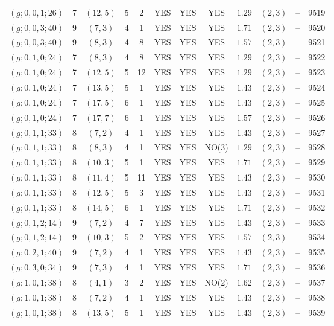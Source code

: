 \begin{longtable}{|c|c|c|c|c|c|c|c|c|c|c|c|}
$(g;0,0,1;26)$ & 7 & $(12,5)$ & 5 & 2 & YES & YES & YES & $1.29$ & $(2,3)$ & -- & 9519\\
$(g;0,0,3;40)$ & 9 & $(7,3)$ & 4 & 1 & YES & YES & YES & $1.71$ & $(2,3)$ & -- & 9520\\
$(g;0,0,3;40)$ & 9 & $(8,3)$ & 4 & 8 & YES & YES & YES & $1.57$ & $(2,3)$ & -- & 9521\\
$(g;0,1,0;24)$ & 7 & $(8,3)$ & 4 & 8 & YES & YES & YES & $1.29$ & $(2,3)$ & -- & 9522\\
$(g;0,1,0;24)$ & 7 & $(12,5)$ & 5 & 12 & YES & YES & YES & $1.29$ & $(2,3)$ & -- & 9523\\
$(g;0,1,0;24)$ & 7 & $(13,5)$ & 5 & 1 & YES & YES & YES & $1.43$ & $(2,3)$ & -- & 9524\\
$(g;0,1,0;24)$ & 7 & $(17,5)$ & 6 & 1 & YES & YES & YES & $1.43$ & $(2,3)$ & -- & 9525\\
$(g;0,1,0;24)$ & 7 & $(17,7)$ & 6 & 1 & YES & YES & YES & $1.57$ & $(2,3)$ & -- & 9526\\
$(g;0,1,1;33)$ & 8 & $(7,2)$ & 4 & 1 & YES & YES & YES & $1.43$ & $(2,3)$ & -- & 9527\\
$(g;0,1,1;33)$ & 8 & $(8,3)$ & 4 & 1 & YES & YES & NO(3) & $1.29$ & $(2,3)$ & -- & 9528\\
$(g;0,1,1;33)$ & 8 & $(10,3)$ & 5 & 1 & YES & YES & YES & $1.71$ & $(2,3)$ & -- & 9529\\
$(g;0,1,1;33)$ & 8 & $(11,4)$ & 5 & 11 & YES & YES & YES & $1.43$ & $(2,3)$ & -- & 9530\\
$(g;0,1,1;33)$ & 8 & $(12,5)$ & 5 & 3 & YES & YES & YES & $1.43$ & $(2,3)$ & -- & 9531\\
$(g;0,1,1;33)$ & 8 & $(14,5)$ & 6 & 1 & YES & YES & YES & $1.71$ & $(2,3)$ & -- & 9532\\
$(g;0,1,2;14)$ & 9 & $(7,2)$ & 4 & 7 & YES & YES & YES & $1.43$ & $(2,3)$ & -- & 9533\\
$(g;0,1,2;14)$ & 9 & $(10,3)$ & 5 & 2 & YES & YES & YES & $1.57$ & $(2,3)$ & -- & 9534\\
$(g;0,2,1;40)$ & 9 & $(7,2)$ & 4 & 1 & YES & YES & YES & $1.43$ & $(2,3)$ & -- & 9535\\
$(g;0,3,0;34)$ & 9 & $(7,3)$ & 4 & 1 & YES & YES & YES & $1.71$ & $(2,3)$ & -- & 9536\\
$(g;1,0,1;38)$ & 8 & $(4,1)$ & 3 & 2 & YES & YES & NO(2) & $1.62$ & $(2,3)$ & -- & 9537\\
$(g;1,0,1;38)$ & 8 & $(7,2)$ & 4 & 1 & YES & YES & YES & $1.43$ & $(2,3)$ & -- & 9538\\
$(g;1,0,1;38)$ & 8 & $(13,5)$ & 5 & 1 & YES & YES & YES & $1.43$ & $(2,3)$ & -- & 9539\\

\end{longtable}
